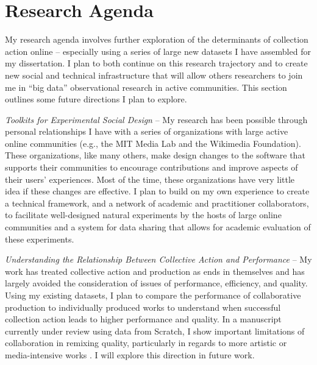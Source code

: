 \documentclass[10pt]{memoir}
\begin{document}

\section{Research Agenda}

My research agenda involves further exploration of the determinants of
collection action online -- especially using a series of large new
datasets I have assembled for my dissertation. I plan to both continue
on this research trajectory and to create new social and technical
infrastructure that will allow others researchers to join me in ``big
data'' observational research in active communities. This section
outlines some future directions I plan to explore.

\emph{Toolkits for Experimental Social Design} -- My research has been
possible through personal relationships I have with a series of
organizations with large active online communities (e.g., the MIT
Media Lab and the Wikimedia Foundation). These organizations, like
many others, make design changes to the software that supports their
communities to encourage contributions and improve aspects of their
users' experiences. Most of the time, these organizations have very
little idea if these changes are effective. I plan to build on my own
experience to create a technical framework, and a network of academic
and practitioner collaborators, to facilitate well-designed natural
experiments by the hosts of large online communities and a system for
data sharing that allows for academic evaluation of these experiments.

\emph{Understanding the Relationship Between Collective Action and
  Performance} -- My work has treated collective action and production
as ends in themselves and has largely avoided the consideration of
issues of performance, efficiency, and quality. Using my existing
datasets, I plan to compare the performance of collaborative
production to individually produced works to understand when
successful collection action leads to higher performance and
quality. In a manuscript currently under review using data from
Scratch, I show important limitations of collaboration in remixing
quality, particularly in regards to more artistic or media-intensive
works \cite{hill_cost_2012}. I will explore this direction in future
work.
\end{document}
